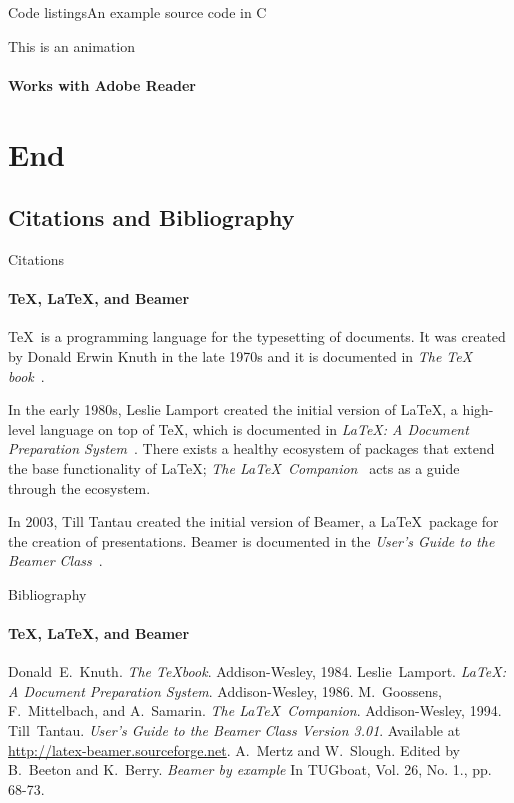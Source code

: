 \documentclass[compress]{beamer}
\begin{document}
\begin{frame}{Code listings}{An example source code in C}
\sleepSort
\end{frame}

\begin{frame}{This is an animation}
\framesubtitle{Works with Adobe Reader}
\end{frame}

\section{End}

\subsection{Citations and Bibliography}

\begin{frame}[label=citations]{Citations}
\framesubtitle{\TeX, \LaTeX, and Beamer}

\justifying\TeX\ is a programming language for the typesetting
of documents. It was created by Donald Erwin Knuth in the late
1970s and it is documented in \emph{The \TeX
book}~\cite{knuth84}.

In the early 1980s, Leslie Lamport created the initial version
of \LaTeX, a high-level language on top of \TeX, which is
documented in \emph{\LaTeX : A Document Preparation
System}~\cite{lamport94}. There exists a healthy ecosystem of
packages that extend the base functionality of \LaTeX;
\emph{The \LaTeX\ Companion}~\cite{MG94} acts as a guide
through the ecosystem.

In 2003, Till Tantau created the initial version of Beamer, a
\LaTeX\ package for the creation of presentations. Beamer is
documented in the \emph{User's Guide to the Beamer
Class}~\cite{tantau04}.
\end{frame}

\begin{frame}[label=bibliography]{Bibliography}
\framesubtitle{\TeX, \LaTeX, and Beamer}
\begin{thebibliography}{9}
Donald~E.~Knuth.
\emph{The \TeX book}.
Addison-Wesley, 1984.
Leslie~Lamport.
\emph{\LaTeX : A Document Preparation System}.
Addison-Wesley, 1986.
M.~Goossens, F.~Mittelbach, and A.~Samarin.
\emph{The \LaTeX\ Companion}.
Addison-Wesley, 1994.
Till~Tantau.
\emph{User's Guide to the Beamer Class Version 3.01}.
Available at \url{http://latex-beamer.sourceforge.net}.
A.~Mertz and W.~Slough.
Edited by B.~Beeton and K.~Berry.
\emph{Beamer by example} In TUGboat,
Vol. 26, No. 1., pp. 68-73.
\end{thebibliography}
\end{frame}
\end{document}
